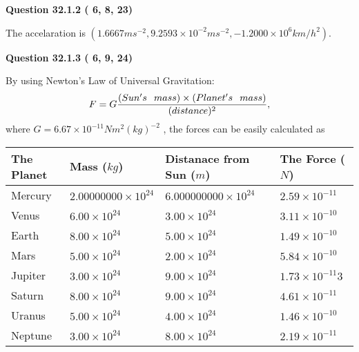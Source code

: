 \documentclass[12pt]{article}
\begin{document}
 
 
  
\vspace{0.2in}
  
{\textbf{\Large{Question
32.1.2 
 (          6,          8,         23)
}}}
  
  
 
 
\noindent{}
 
 
The accelaration is
$(
1.6667ms^{-2},
9.2593 \times 10^{-2}ms^{-2},
-1.2000 \times 10^{6}km/h^2
).
$
 
 
 
 
  
\vspace{0.2in}
  
{\textbf{\Large{Question
32.1.3 
 (          6,          9,         24)
}}}
  
  
 
 
\noindent{}

By using Newton's Law of Universal Gravitation:
\[
F=G \frac{(Sun's \hspace{0.1in} mass) \times (Planet's \hspace{0.1in} mass)} { (distance)^2},
\]
where
$ G= %
6.67 \times 10^{-11} N m^{2}(kg)^{-2}$ , the forces can be easily calculated as
 
\vspace{0.2in}
 
 
\begin{tabular}{|l|l|l|l|}
\hline
The Planet & Mass ($kg$) & Distanace from Sun ($m$) & The Force ($N$)\\
\hline
Mercury  &
           $ %
2.00000000 \times 10^{24}  $   &
             $ %
6.000000000 \times 10^{24}$    & $ %
2.59 \times 10^{-11} $
\\  \hline
Venus    &
           $  %
6.00 \times 10^{24}  $     &
             $ %
3.00 \times 10^{24} $    & $ %
3.11 \times 10^{-10} $
\\  \hline
Earth    &
           $  %
8.00 \times 10^{24}$     &
             $ %
5.00 \times 10^{24} $    & $ %
1.49 \times 10^{-10} $
\\   \hline
Mars     &
           $  %
5.00 \times 10^{24} $     &
             $ %
2.00 \times 10^{24}$    & $ %
5.84 \times 10^{-10} $
\\   \hline
Jupiter  &
           $  %
3.00 \times 10^{24}  $    &
             $ %
9.00 \times 10^{24} $    & $ %
1.73 \times 10^{-11}3 $
\\  \hline
Saturn   &
           $  %
8.00 \times 10^{24}   $    &
             $ %
9.00 \times 10^{24}  $    & $ %
4.61 \times 10^{-11} $
\\  \hline
Uranus   &
           $  %
5.00 \times 10^{24} $    &
             $ %
4.00 \times 10^{24}$    & $ %
1.46 \times 10^{-10} $
\\  \hline
Neptune  &
           $  %
3.00 \times 10^{24}  $    &
             $ %
8.00 \times 10^{24} $    & $ %
2.19 \times 10^{-11} $
\\  \hline
 
\end{tabular}
 
\end{document}
